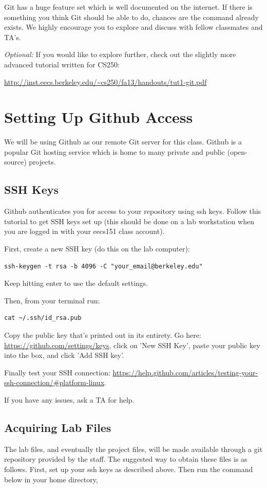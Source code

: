 \documentclass[11pt]{article}
\begin{document}
Git has a huge feature set which is well documented on the internet. If there is something you think Git should be able to do, chances are the command already exists. We highly encourage you to explore and discuss with fellow classmates and TA's.

\textit{Optional:} If you would like to explore further, check out the slightly more advanced tutorial written for CS250:

\url{http://inst.eecs.berkeley.edu/~cs250/fa13/handouts/tut1-git.pdf}

\section{Setting Up Github Access}
We will be using Github as our remote Git server for this class. Github is a popular Git hosting service which is home to many private and public (open-source) projects.

\subsection{SSH Keys}
Github authenticates you for access to your repository using ssh keys. Follow this tutorial to get SSH keys set up (this should be done on a lab workstation when you are logged in with your eecs151 class account).

First, create a new SSH key (do this on the lab computer):
\begin{verbatim}
ssh-keygen -t rsa -b 4096 -C "your_email@berkeley.edu"
\end{verbatim}
Keep hitting enter to use the default settings.

Then, from your terminal run:
\begin{verbatim}
cat ~/.ssh/id_rsa.pub
\end{verbatim}

Copy the public key that's printed out in its entirety. Go here: \url{https://github.com/settings/keys}, click on 'New SSH Key', paste your public key into the box, and click 'Add SSH key'.

Finally test your SSH connection: \url{https://help.github.com/articles/testing-your-ssh-connection/#platform-linux}.

If you have any issues, ask a TA for help.

\subsection{Acquiring Lab Files}
The lab files, and eventually the project files, will be made available through a git repository provided by the staff. The suggested way to obtain these files is as follows. First, set up your ssh keys as described above. Then run the command below in your home directory,
\end{document}
